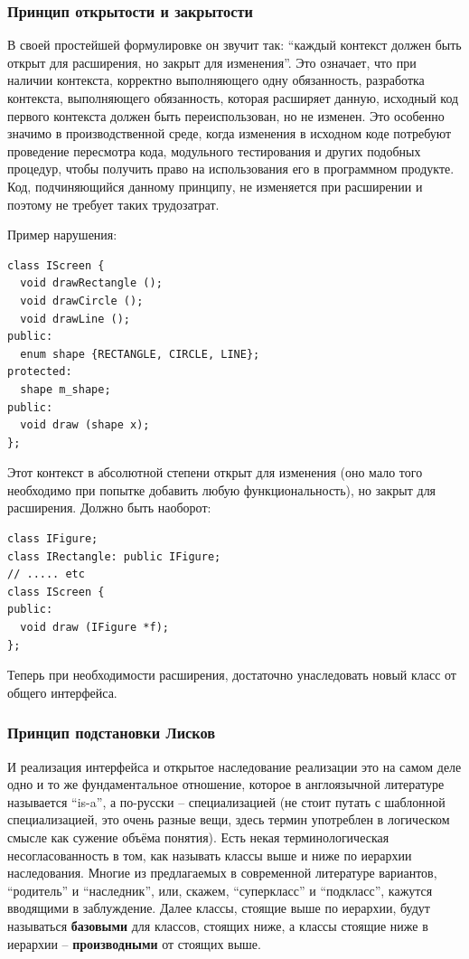 \documentclass[a4paper,12pt,oneside]{article}
\begin{document}
\subsubsection{Принцип открытости и закрытости}\label{OCP}

В своей простейшей формулировке он звучит так: ``каждый контекст должен быть открыт для расширения, но закрыт для изменения''. Это означает, что при наличии контекста, корректно выполняющего одну обязанность, разработка контекста, выполняющего обязанность, которая расширяет данную, исходный код первого контекста должен быть переиспользован, но не изменен. Это особенно значимо в производственной среде, когда изменения в исходном коде потребуют проведение пересмотра кода, модульного тестирования и других подобных процедур, чтобы получить право на использования его в программном продукте. Код, подчиняющийся данному принципу, не изменяется при расширении и поэтому не требует таких трудозатрат.

Пример нарушения:

\begin{lstlisting}
class IScreen {
  void drawRectangle ();
  void drawCircle ();
  void drawLine ();
public:
  enum shape {RECTANGLE, CIRCLE, LINE};
protected:
  shape m_shape;
public:
  void draw (shape x);  
};
\end{lstlisting}

Этот контекст в абсолютной степени открыт для изменения (оно мало того необходимо при попытке добавить любую функциональность), но закрыт для расширения. Должно быть наоборот:

\begin{lstlisting}
class IFigure;
class IRectangle: public IFigure;
// ..... etc
class IScreen {
public:
  void draw (IFigure *f);
};
\end{lstlisting}

Теперь при необходимости расширения, достаточно унаследовать новый класс от общего интерфейса.

\subsubsection{Принцип подстановки Лисков}\label{LSP}

И реализация интерфейса и открытое наследование реализации это на самом деле одно и то же фундаментальное отношение, которое в англоязычной литературе называется ``is-a'', а по-русски -- специализацией (не стоит путать с шаблонной специализацией, это очень разные вещи, здесь термин употреблен в логическом смысле как сужение объёма понятия). Есть некая терминологическая несогласованность в том, как называть классы выше и ниже по иерархии наследования. Многие из предлагаемых в современной литературе вариантов, ``родитель'' и ``наследник'', или, скажем, ``суперкласс'' и ``подкласс'', кажутся вводящими в заблуждение. Далее классы, стоящие выше по иерархии, будут называться \textbf{базовыми} для классов, стоящих ниже, а классы стоящие ниже в иерархии -- \textbf{производными} от стоящих выше.
\end{document}
